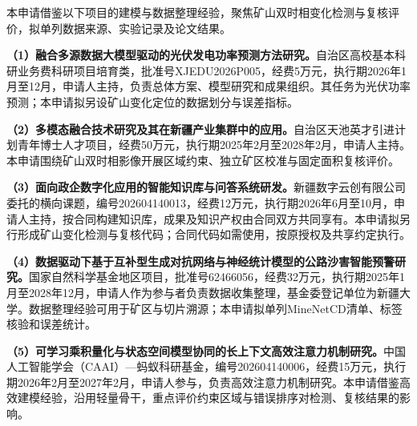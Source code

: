 本申请借鉴以下项目的建模与数据整理经验，聚焦矿山双时相变化检测与复核评价，拟单列数据来源、实验记录及论文结果。

\textbf{（1）融合多源数据大模型驱动的光伏发电功率预测方法研究。}自治区高校基本科研业务费科研项目培育类，批准号XJEDU2026P005，经费5万元，执行期2026年1月至12月，申请人主持，负责总体方案、模型研究和成果组织。其任务为光伏功率预测；本申请拟另设矿山变化定位的数据划分与误差指标。

\textbf{（2）多模态融合技术研究及其在新疆产业集群中的应用。}自治区天池英才引进计划青年博士人才项目，经费50万元，执行期2025年2月至2028年2月，申请人主持。本申请围绕矿山双时相影像开展区域约束、独立矿区校准与固定面积复核评价。

\textbf{（3）面向政企数字化应用的智能知识库与问答系统研发。}新疆数字云创有限公司委托的横向课题，编号202604140013，经费12万元，执行期2026年6月至10月，申请人主持，按合同构建知识库，成果及知识产权由合同双方共同享有。本申请拟另行形成矿山变化检测与复核代码；合同代码如需使用，按原授权及共享约定执行。

\textbf{（4）数据驱动下基于互补型生成对抗网络与神经统计模型的公路沙害智能预警研究。}国家自然科学基金地区项目，批准号62466056，经费32万元，执行期2025年1月至2028年12月，申请人作为参与者负责数据收集整理，基金委登记单位为新疆大学。数据整理经验可用于矿区与切片溯源；本申请拟单列MineNetCD清单、标签核验和误差统计。

\textbf{（5）可学习乘积量化与状态空间模型协同的长上下文高效注意力机制研究。}中国人工智能学会（CAAI）—蚂蚁科研基金，编号202604140006，经费15万元，执行期2026年2月至2027年2月，申请人参与，负责高效注意力机制研究。本申请借鉴高效建模经验，沿用轻量骨干，重点评价约束区域与错误排序对检测、复核结果的影响。
